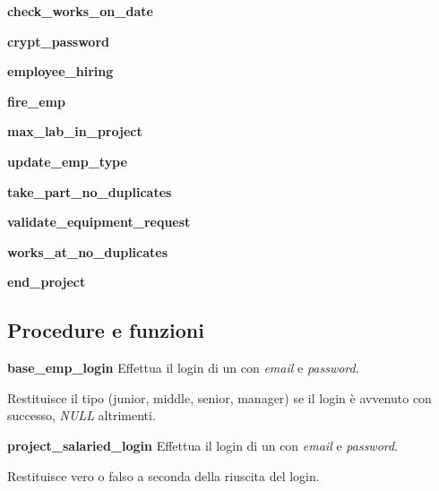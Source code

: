 \newpage
\noindent \textbf{check\_works\_on\_date}
\bigskip

\noindent \textbf{crypt\_password}
\bigskip

\newpage
\noindent \textbf{employee\_hiring}
\bigskip

\noindent \textbf{fire\_emp}
\bigskip

\noindent \textbf{max\_lab\_in\_project}
\bigskip

\noindent \textbf{update\_emp\_type}
\bigskip

\newpage
\noindent \textbf{take\_part\_no\_duplicates}
\bigskip

\noindent \textbf{validate\_equipment\_request}
\bigskip

\noindent \textbf{works\_at\_no\_duplicates}
\bigskip

\noindent \textbf{end\_project}


\newpage
\subsection{Procedure e funzioni}
\noindent \textbf{base\_emp\_login}\sskip
Effettua il login di un \textit{\baseemp} con \textit{email} e \textit{password}.

Restituisce il tipo (junior, middle, senior, manager) se il login è avvenuto con successo, \textit{NULL} altrimenti.
\bigskip

\noindent \textbf{project\_salaried\_login}\sskip
Effettua il login di un \textit{\projectsalaried} con \textit{email} e \textit{password}.

Restituisce vero o falso a seconda della riuscita del login.
\bigskip

